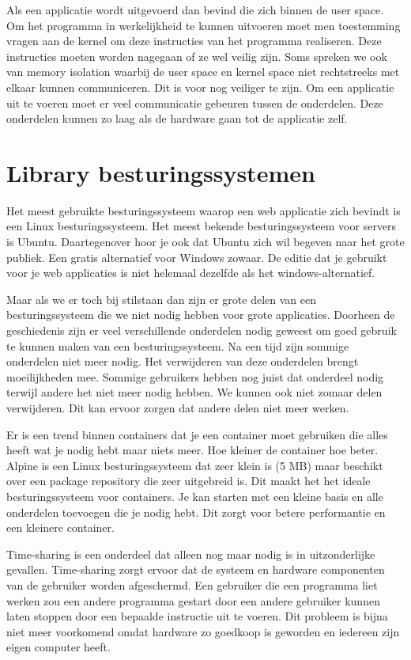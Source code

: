 \documentclass[pdftex,a4paper,12pt,twoside]{report}
\begin{document}
Als een applicatie wordt uitgevoerd dan bevind die zich binnen de user space. Om het programma in werkelijkheid te kunnen uitvoeren moet men toestemming vragen aan de kernel om deze instructies van het programma realiseren. Deze instructies moeten worden nagegaan of ze wel veilig zijn.  Soms spreken we ook van memory isolation waarbij de user space en kernel space niet rechtstreeks met elkaar kunnen communiceren. Dit is voor nog veiliger te zijn. Om een applicatie uit te voeren moet er veel communicatie gebeuren tussen de onderdelen. Deze onderdelen kunnen zo laag als de hardware gaan tot de applicatie zelf.

\section{Library besturingssystemen}

Het meest gebruikte besturingssysteem waarop een web applicatie zich bevindt is een Linux besturingssysteem. Het meest bekende besturingssysteem voor servers is Ubuntu. Daartegenover hoor je ook dat Ubuntu zich wil begeven naar het grote publiek. Een gratis alternatief voor Windows zowaar. De editie dat je gebruikt voor je web applicaties is niet helemaal dezelfde als het windows-alternatief. 

Maar als we er toch bij stilstaan dan zijn er grote delen van een besturingssysteem die we niet nodig hebben voor grote applicaties. Doorheen de geschiedenis zijn er veel verschillende onderdelen nodig geweest om goed gebruik te kunnen maken van een besturingssysteem. Na een tijd zijn sommige onderdelen niet meer nodig. Het verwijderen van deze onderdelen brengt moeilijkheden mee. Sommige gebruikers hebben nog juist dat onderdeel nodig terwijl andere het niet meer nodig hebben. We kunnen ook niet zomaar delen verwijderen. Dit kan ervoor zorgen dat andere delen niet meer werken. 

Er is een trend binnen containers dat je een container moet gebruiken die alles heeft wat je nodig hebt maar niets meer. Hoe kleiner de container hoe beter. Alpine is een Linux besturingssysteem dat zeer klein is (5 MB) maar beschikt over een package repository die zeer uitgebreid is. Dit maakt het het ideale besturingssysteem voor containers. Je kan starten met een kleine basis en alle onderdelen toevoegen die je nodig hebt. Dit zorgt voor betere performantie en een kleinere container.

 Time-sharing is een onderdeel dat alleen nog maar nodig is in uitzonderlijke gevallen. Time-sharing zorgt ervoor dat de systeem en hardware componenten van de gebruiker worden afgeschermd. Een gebruiker die een programma liet werken zou een andere programma gestart door een andere gebruiker kunnen laten stoppen door een bepaalde instructie uit te voeren. Dit probleem is bijna niet meer voorkomend omdat hardware zo goedkoop is geworden en iedereen zijn eigen computer heeft.
\end{document}
